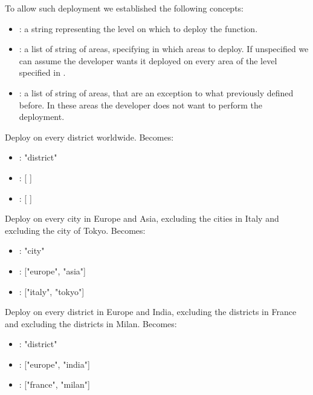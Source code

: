 To allow such deployment we established the following concepts:
\begin{itemize}
    \item {}: a string representing the level on which to deploy the function.
    \item {}: a list of string of areas, specifying in which areas to deploy. If unspecified we can assume the developer wants it deployed on every area of the level specified in . 
     \item {}: a list of string of areas, that are an exception to what previously defined before. In these areas the developer does not want to perform the deployment.
\end{itemize}

\begin{example}
Deploy on every district worldwide.
Becomes:
\begin{itemize}
    \item {}: "district"
    \item {}: [ ]
    \item {}: [ ]
\end{itemize}
\end{example}

\begin{example}
Deploy on every city in Europe and Asia, excluding the cities in Italy and excluding the city of Tokyo.
Becomes:
\begin{itemize}
    \item {}: "city"
    \item {}: ["europe", "asia"]
     \item {}: ["italy", "tokyo"]
\end{itemize}
\end{example}

\begin{example}
Deploy on every district in Europe and India, excluding the districts in France and excluding the districts in Milan.
Becomes:
\begin{itemize}
    \item {}: "district"
    \item {}: ["europe", "india"]
     \item {}: ["france", "milan"]
\end{itemize}
\end{example}

